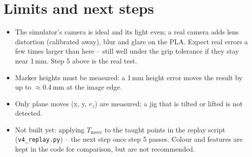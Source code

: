 \documentclass[11pt,a4paper]{article}
\newcommand{\code}[1]{\texttt{\small #1}}
\begin{document}
\section{Limits and next steps}
\begin{itemize}
\item The simulator's camera is ideal and its light even; a real camera adds lens distortion (calibrated away), blur
and glare on the PLA. Expect real errors a few times larger than here -- still well under the grip tolerance if they
stay near 1\,mm. Step 5 above is the real test.
\item Marker heights must be measured: a 1\,mm height error moves the result by up to $\approx$0.4\,mm at the image edge.
\item Only plane moves (x, y, $r_z$) are measured; a jig that is tilted or lifted is not detected.
\item Not built yet: applying $T_\text{move}$ to the taught points in the replay script (\code{v4\_replay.py}) -- the
next step once step 5 passes. Colour and features are kept in the code for comparison, but are not recommended.
\end{itemize}
\end{document}
